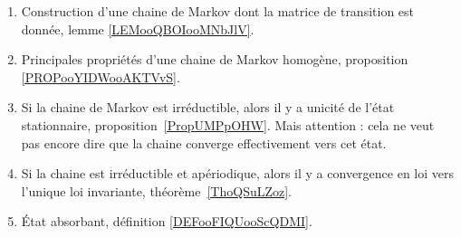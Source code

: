 
\begin{enumerate}
	\item
	      Construction d'une chaine de Markov dont la matrice de transition est donnée, lemme \ref{LEMooQBOIooMNbJlV}.
	\item
	      Principales propriétés d'une chaine de Markov homogène, proposition \ref{PROPooYIDWooAKTVvS}.
	\item
	      Si la chaine de Markov est irréductible, alors il y a unicité de l'état stationnaire, proposition~\ref{PropUMPpOHW}. Mais attention : cela ne veut pas encore dire que la chaine converge effectivement vers cet état.
	\item
	      Si la chaine est irréductible et apériodique, alors il y a convergence en loi vers l'unique loi invariante, théorème~\ref{ThoQSuLZoz}.
	\item
	      État absorbant, définition \ref{DEFooFIQUooScQDMI}.
\end{enumerate}
